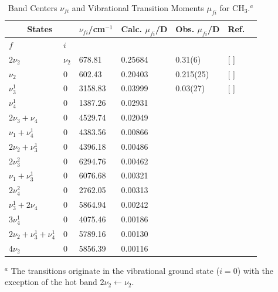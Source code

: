 \documentclass{achemso}
\newcommand{\3}{$_{3}$}
\newcommand{\cm}{cm$^{-1}$}
\begin{document}
\begin{table}
\caption{\label{t:tm:1}  Band Centers $\nu_{fi}$ and Vibrational Transition Moments $\mu_{fi}$ for CH$_3$.$^a$}
\begin{center}
\renewcommand{\arraystretch}{1.25}
\begin{tabular}{llllllll}
\hline
\multicolumn{2}{c}{States}       &  \multicolumn{1}{c}{$\nu_{fi}$/\cm} &
\multicolumn{2}{c}{Calc. $\mu_{fi}$/D} & Obs. $\mu_{fi}$/D
   & Ref.    \\
\hline
$f$                            & $i$   \\
\hline
$ 2\nu_2	        $ &   $\nu_2$	 &	678.81	 &	0.25684	  && 0.31(6)   & [\citenum{mu2_08} ] 	           \\
$  \nu_2	        $ &	0        &	602.43	 &	0.20403	  && 0.215(25) & [\citenum{mu2_05,mu2_83,mu2_89} ] \\
$  \nu_3^1	        $ &	0	 &	3158.83	 &	0.03999	  && 0.03(27)  & [\citenum{mu3_95,mu3_94} ] 	   \\
\cline{1-8}
$  \nu_4^1	        $ &	0	 &	1387.26	 &	0.02931	  &&	       &		                   \\
$ 2\nu_3   +  \nu_4	$ &	0	 &	4529.74	 &	0.02049	  &&	       &		                   \\
$  \nu_1   +  \nu_4^1	$ &	0	 &	4383.56	 &	0.00866	  &&	       &		                   \\
$ 2\nu_2   +  \nu_3^1	$ &	0	 &	4396.18	 &	0.00486	  &&	       &		                   \\
$ 2\nu_3^2	        $ &	0	 &	6294.76	 &	0.00462	  &&	       &		                   \\
$  \nu_1   +  \nu_3^1	$ &	0	 &	6076.68	 &	0.00321	  &&	       &		                   \\
$ 2\nu_4^2	        $ &	0	 &	2762.05	 &	0.00313	  &&	       &		                   \\
$  \nu_3^1 + 2\nu_4	$ &	0	 &	5864.94	 &	0.00242	  &&	       &		                   \\
$ 3\nu_4^1	        $ &	0	 &	4075.46	 &	0.00186	  &&	       &		                   \\
$ 2\nu_2+\nu_3^1+\nu_4^1$ &	0	 &	5789.16	 &	0.00130	  &&	       &		                   \\
$ 4\nu_2	        $ &	0	 &	5856.39	 &	0.00116	  &&	       &		                   \\
\hline
\end{tabular}
\end{center}
\begin{flushleft}
\noindent \vspace*{0.1truecm}
$^a$ The transitions originate in the vibrational ground state
($i=0$) with the exception of the hot band $2\nu_2\leftarrow\nu_2$.
\end{flushleft}
\end{table}
\end{document}
